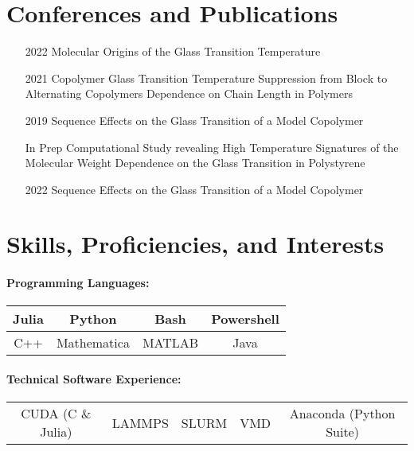\documentclass{my_cv}
\begin{document}
\section{Conferences and Publications}
\begin{itemize}
    \item[2022] Molecular Origins of the Glass Transition Temperature \item[2021] Co\-polymer Glass Transition Temperature Suppression from Block to Alternating Co\-polymers Dependence on Chain Length in Polymers
    \item[2019] Sequence Effects on the Glass Transition of a Model Co\-polymer
\end{itemize}

\begin{itemize}
    \item[In Prep] Computational Study revealing High Temperature Signatures of the Molecular Weight Dependence on the Glass Transition in Polystyrene
    \item[2022] Sequence Effects on the Glass Transition of a Model Co\-polymer
\end{itemize}

\section{Skills, Proficiencies, and Interests}

\paragraph{Programming Languages:}
\begin{center}
\begin{tabular}{c|c|c|c}
    Julia & Python & Bash & Powershell \\
    \hline
    C++ & Mathematica & MATLAB & Java \\
\end{tabular}
\end{center}

\paragraph{Technical Software Experience:}
\begin{center}
\begin{tabular}{c|c|c|c|c}
   CUDA (C \& Julia) & LAMMPS & SLURM & VMD & Anaconda (Python Suite) \\
\end{tabular}
\end{center}
\end{document}
